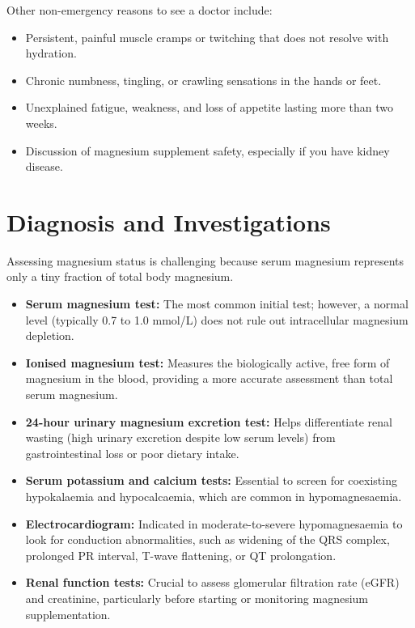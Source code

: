 Other non-emergency reasons to see a doctor include:
\begin{itemize}
    \item Persistent, painful muscle cramps or twitching that does not resolve with hydration.
    \item Chronic numbness, tingling, or crawling sensations in the hands or feet.
    \item Unexplained fatigue, weakness, and loss of appetite lasting more than two weeks.
    \item Discussion of magnesium supplement safety, especially if you have kidney disease.
\end{itemize}

\section*{Diagnosis and Investigations}
Assessing magnesium status is challenging because serum magnesium represents only a tiny fraction of total body magnesium.
\begin{itemize}
    \item \textbf{Serum magnesium test:} The most common initial test; however, a normal level (typically 0.7 to 1.0 mmol/L) does not rule out intracellular magnesium depletion.
    \item \textbf{Ionised magnesium test:} Measures the biologically active, free form of magnesium in the blood, providing a more accurate assessment than total serum magnesium.
    \item \textbf{24-hour urinary magnesium excretion test:} Helps differentiate renal wasting (high urinary excretion despite low serum levels) from gastrointestinal loss or poor dietary intake.
    \item \textbf{Serum potassium and calcium tests:} Essential to screen for coexisting hypokalaemia and hypocalcaemia, which are common in hypomagnesaemia.
    \item \textbf{Electrocardiogram:} Indicated in moderate-to-severe hypomagnesaemia to look for conduction abnormalities, such as widening of the QRS complex, prolonged PR interval, T-wave flattening, or QT prolongation.
    \item \textbf{Renal function tests:} Crucial to assess glomerular filtration rate (eGFR) and creatinine, particularly before starting or monitoring magnesium supplementation.
\end{itemize}

